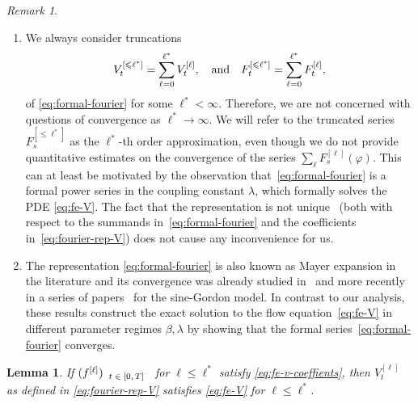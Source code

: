 \documentclass[11pt, a4paper]{scrartcl}
\numberwithin{equation}{section}
\theoremstyle{plain}
\newtheorem{lemma}[foo]{Lemma}
\theoremstyle{remark}
\newtheorem{remark}[foo]{Remark}
\newcommand{\tmscript}[1]{\text{\scriptsize{$#1$}}}
\newenvironment{enumeratealpha}{\begin{enumerate}[a{\textup{)}}] }{\end{enumerate}}
\begin{document}
\begin{remark}
\begin{enumeratealpha}
		\item We always consider truncations
		\[ V_t^{[\leqslant \ell^{\ast}]} = \sum_{\ell = 0}^{\ell^{\ast}}
			V_t^{[\ell]}, \quad \text{and\quad} F_t^{[\leqslant \ell^{\ast}]} =
			\sum_{\ell = 0}^{\ell^{\ast}} F_t^{[\ell]}, \]
		of \eqref{eq:formal-fourier} for some $\ell^{\ast} < \infty$. Therefore,
		we are not concerned with questions of convergence as $\ell^{\ast}
			\rightarrow \infty$. We will refer to the
		truncated series $F^{[\leqslant \ell^{\ast}]}_s$ as the
			{$\ell^{\ast}$-th order approximation}, even though we do not
		provide quantitative estimates on the convergence of the series
		$\sum_{\ell} F^{[\ell]}_s (\varphi)$. This can at least be motivated by
		the observation that~\eqref{eq:formal-fourier} is a formal power series in
		the coupling constant $\lambda$, which formally solves the PDE \eqref{eq:fe-V}. The fact that the representation is not
		unique \ (both with respect to the summands in~\eqref{eq:formal-fourier}
		and the coefficients in~\eqref{eq:fourier-rep-V}) does not cause any
		inconvenience for us.

		\item The representation \eqref{eq:formal-fourier} is also known as Mayer
		expansion in the literature and its convergence was already studied
		in~{\cite{brydgesMayerExpansionsHamiltonJacobi1987}} and more recently in
		a series of
		papers~{\cite{bauerschmidtLogSobolevInequalityContinuum2021,bauerschmidtMaximumCouplingSineGordon2022,bauerschmidtColemanCorrespondenceFree2023,kroschinskyMayerSeriesTwoDimensional2019}}
		for the sine-Gordon model. In contrast to our analysis, these results
		construct the exact solution to the flow equation~\eqref{eq:fe-V} in different parameter regimes $\beta,\lambda$ by showing that the formal
		series~\eqref{eq:formal-fourier} converges.
	\end{enumeratealpha}
\end{remark}
\begin{lemma}\label{lem:equivalence-fe}
	If $(f^{[\ell]})_{\tmscript{\begin{array}{c}
						t \in [0, T]
					\end{array}}}$ for $\ell \leqslant \ell^{\ast}$ satisfy
	\eqref{eq:fe-v-coeffients}, then $V^{[\ell]}_t$ as defined in
	\eqref{eq:fourier-rep-V} satisfies \eqref{eq:fe-V} for $\ell\leqslant\ell^\ast$.
\end{lemma}
\end{document}
